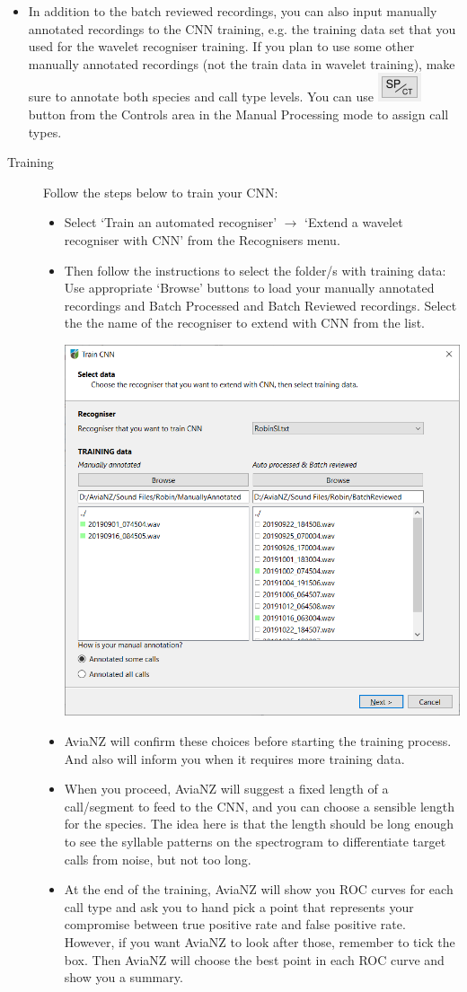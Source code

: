 \documentclass{article}
\begin{document}
\begin{description}
\begin{itemize}
\item In addition to the batch reviewed recordings, you can also input manually annotated recordings to the CNN training, e.g. the training data set that you used for the wavelet recogniser training. If you plan to use some other manually annotated recordings (not the train data in wavelet training), make sure to annotate both species and call type levels. You can use \includegraphics[scale=0.5]{Figs/SPCT} button from the Controls area in the Manual Processing mode to assign call types.
\end{itemize}
\end{description}
 
\begin{description}
\item[Training] Follow the steps below to train your CNN:
\begin{itemize}
\item Select `Train an automated recogniser' $\rightarrow$ `Extend a wavelet recogniser with CNN' from the Recognisers menu. 
\item Then follow the instructions to select the folder/s with training data: Use appropriate `Browse' buttons to load your manually annotated recordings and Batch Processed and Batch Reviewed recordings. Select the the name of the recogniser to extend with CNN from the list.

\begin{center}
    \includegraphics[width=.4\textwidth]{Figs/CNNpage1}
\end{center}

\item AviaNZ will confirm these choices before starting the training process. And also will inform you when it requires more training data.
\item When you proceed, AviaNZ will suggest a fixed length of a call/segment to feed to the CNN, and you can choose a sensible length for the species. The idea here is that the length should be long enough to see the syllable patterns on the spectrogram to differentiate target calls from noise, but not too long.
\item At the end of the training, AviaNZ will show you ROC curves for each call type and ask you to hand pick a point that represents your compromise between true positive rate and false positive rate. However, if you want AviaNZ to look after those, remember to tick the box. Then AviaNZ will choose the best point in each ROC curve and show you a summary.


\end{itemize}
\end{description}
\end{document}
